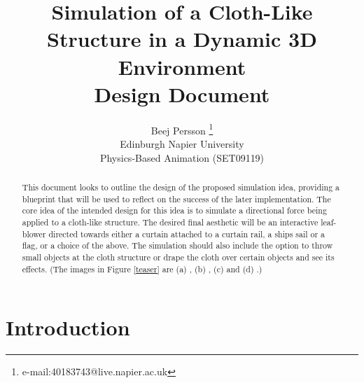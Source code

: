 \documentclass[conference,backref=page]{acmsiggraph}
\title{Simulation of a Cloth-Like Structure in a Dynamic 3D Environment\\
	   Design Document}
\author{Beej Persson \thanks{e-mail:40183743@live.napier.ac.uk} \\
Edinburgh Napier University\\
Physics-Based Animation (SET09119)}
\begin{document}

\maketitle

\raggedbottom

\begin{abstract}

This document looks to outline the design of the proposed simulation idea, providing a blueprint that will be used to reflect on the success of the later implementation. The core idea of the intended design for this idea is to simulate a directional force being applied to a cloth-like structure. The desired final aesthetic will be an interactive leaf-blower directed towards either a curtain attached to a curtain rail, a ships sail or a flag, or a choice of the above. The simulation should also include the option to throw small objects at the cloth structure or drape the cloth over certain objects and see its effects. (The images in Figure \ref{teaser} are (a) \cite{sail}, (b) \cite{clothmesh}, (c) \cite{flag} and (d) \cite{object}.)

\end{abstract}



\keywordlist





\section{Introduction}


\end{document}
